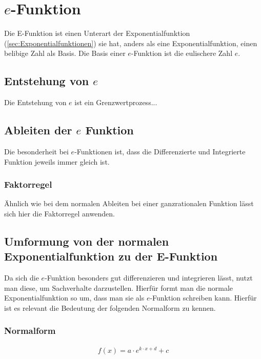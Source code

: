 \section{$e$-Funktion}\label{sec:e-Funktion}
Die E-Funktion ist einen Unterart der Exponentialfunktion (\ref{sec:Exponentialfunktionen}) sie hat, anders als eine Exponentialfunktion, einen belibige Zahl als Basis. Die Basis einer $e$-Funktion ist die eulischere Zahl $e$. 
\subsection{Entstehung von $e$} \label{sec:e-Funktion/Entstehung von e}
Die Entstehung von $e$ ist ein Grenzwertprozess...
\subsection{Ableiten der $e$ Funktion}\label{sec:e-Funktion/Ableiten der e Funktion}
Die besonderheit bei $e$-Funktionen ist, dass die Differenzierte und Integrierte Funktion jeweils immer gleich ist. 
\subsubsection{Faktorregel} 
Ähnlich wie bei dem normalen Ableiten bei einer ganzrationalen Funktion lässt sich hier die Faktorregel anwenden.
\subsection{Umformung von der normalen Exponentialfunktion zu der E-Funktion}
Da sich die $e$-Funktion besonders gut differenzieren und integrieren lässt, nutzt man diese, um Sachverhalte darzustellen. Hierfür formt man die normale Exponentialfunktion so um, dass man sie als $e$-Funktion schreiben kann. Hierfür ist es relevant die Bedeutung der folgenden Normalform zu kennen. 
\subsubsection{Normalform}
\begin{align*}
	f(x)=a\cdot e^{k\cdot x+d}+c
\end{align*}


